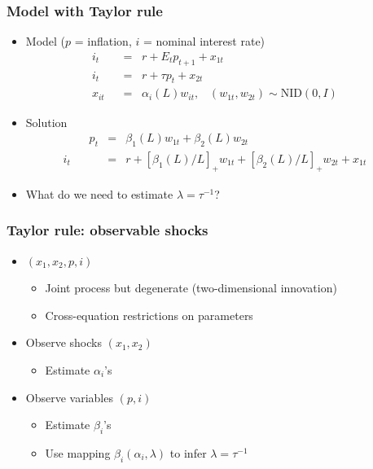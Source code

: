 \documentclass{beamer}
\begin{document}
\begin{frame}
\frametitle{Model with Taylor rule}
\begin{itemize} \itemsep=\bigskipamount
\item Model ($p$ = inflation, $i$ = nominal interest rate)
\begin{align*}
    i_t &\;\;=\;\; r + E_t p_{t+1} + x_{1t} \tag{Euler equation} \\
    i_t &\;\;=\;\; r + \tau p_{t} +  x_{2t} \tag{Taylor rule} \\
    x_{it} &\;\;=\;\; \alpha_i(L) w_{it}, \;\;\; (w_{1t},w_{2t}) \sim \mbox{NID}(0,I)
            \phantom{xx}
\end{align*}
\item Solution
\begin{eqnarray*}
    \phantom{xxxx}
    p_t &=& \beta_1(L) w_{1t} + \beta_2(L) w_{2t} \\
    i_t &=& r + [\beta_1(L)/L]_+ w_{1t} + [\beta_2(L)/L]_+ w_{2t} + x_{1t}
             \phantom{xx}
\end{eqnarray*}
\item What do we need to estimate $\lambda = \tau^{-1}$?
\end{itemize}
\end{frame}

\begin{frame}
\frametitle{Taylor rule:  observable shocks}
\begin{itemize}  \itemsep=\bigskipamount
\item $(x_1,x_2,p,i)$ \\
\begin{itemize}
\item Joint process but degenerate (two-dimensional innovation)
\item Cross-equation restrictions on parameters
\end{itemize}
\item Observe shocks $(x_1,x_2)$ \\
\begin{itemize}
\item Estimate $\alpha_i$'s
\end{itemize}
\item Observe variables $(p,i)$ \\
\begin{itemize}
\item Estimate $\beta_i$'s
\item Use mapping $\beta_i(\alpha_i,\lambda)$ to infer $\lambda = \tau^{-1}$
\end{itemize}
\end{itemize}
\end{frame}
\end{document}
